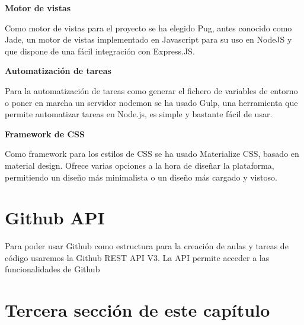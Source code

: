{\bf Motor de vistas}

Como motor de vistas para el proyecto se ha elegido Pug, antes conocido como Jade, un motor de vistas implementado en Javascript para su uso en NodeJS y que dispone de una fácil integración con Express.JS. 

{\bf Automatización de tareas}

Para la automatización de tareas como generar el fichero de variables de entorno o poner en marcha un servidor nodemon se ha usado Gulp, una herramienta que permite automatizar tareas en Node.js, es simple y bastante fácil de usar.

{\bf Framework de CSS}

Como framework para los estilos de CSS se ha usado Materialize CSS, basado en material design. Ofrece varias opciones a la hora de diseñar la plataforma, permitiendo un diseño más minimalista o un diseño más cargado y vistoso.

\section{Github API}
\label{3:sec2}

Para poder usar Github como estructura para la creación de aulas y tareas de código usaremos la Github REST API V3.
La API permite acceder a las funcionalidades de Github

\section{Tercera sección de este capítulo}
\label{:sec3}
